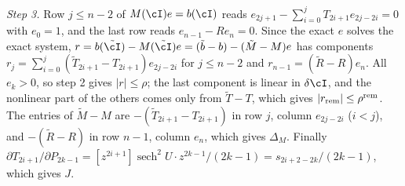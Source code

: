 
\emph{Step 3.} Row $j\le n-2$ of $M(\cI)e=b(\cI)$ reads $e_{2j+1}-\sum_{i=0}^{j}T_{2i+1}e_{2j-2i}=0$ with
$e_0=1$, and the last row reads $e_{n-1}-Re_n=0$. Since the exact $e$ solves the exact system,
$r=b(\tilde\cI)-M(\tilde\cI)e=(\tilde b-b)-(\tilde M-M)e$ has components
$r_j=\sum_{i=0}^{j}(\tilde T_{2i+1}-T_{2i+1})e_{2j-2i}$ for $j\le n-2$ and $r_{n-1}=(\tilde R-R)e_n$. All
$e_k>0$, so step 2 gives $|r|\le\rho$; the last component is linear in $\delta\cI$, and the nonlinear
part of the others comes only from $\tilde T-T$, which gives $|r_{\rm rem}|\le\rho^{\rm rem}$. The
entries of $\tilde M-M$ are $-(\tilde T_{2i+1}-T_{2i+1})$ in row $j$, column $e_{2j-2i}$ ($i<j$), and
$-(\tilde R-R)$ in row $n-1$, column $e_n$, which gives $\Delta_M$. Finally
$\partial T_{2i+1}/\partial P_{2k-1}=[z^{2i+1}]\operatorname{sech}^2U\cdot z^{2k-1}/(2k-1)=s_{2i+2-2k}/(2k-1)$, which gives $J$.

